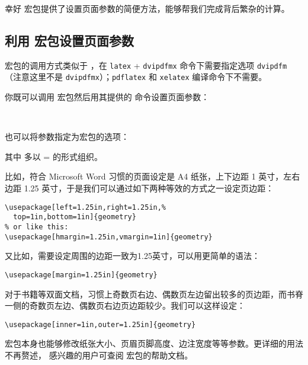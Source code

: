 幸好  宏包提供了设置页面参数的简便方法，能够帮我们完成背后繁杂的计算。

\subsection{利用  宏包设置页面参数}\label{subsec:geometry}

 宏包的调用方式类似于 ，在 \texttt{latex} + \texttt{dvipdfmx} 命令下需要指定选项 \texttt{dvipdfm}
（注意这里不是 \texttt{dvipdfmx}）；\texttt{pdflatex} 和 \texttt{xelatex} 编译命令下不需要。

你既可以调用  宏包然后用其提供的  命令设置页面参数：
\begin{command}
 \\
\end{command}
也可以将参数指定为宏包的选项：
\begin{command}
\end{command}

其中  多以 = 的形式组织。

比如，符合 Microsoft Word 习惯的页面设定是 A4 纸张，上下边距 1 英寸，左右边距 1.25 英寸，于是我们可以通过如下两种等效的方式之一设定页边距：
\begin{verbatim}
\usepackage[left=1.25in,right=1.25in,%
  top=1in,bottom=1in]{geometry}
% or like this:
\usepackage[hmargin=1.25in,vmargin=1in]{geometry}
\end{verbatim}

又比如，需要设定周围的边距一致为1.25英寸，可以用更简单的语法：
\begin{verbatim}
\usepackage[margin=1.25in]{geometry}
\end{verbatim}

对于书籍等双面文档，习惯上奇数页右边、偶数页左边留出较多的页边距，而书脊一侧的奇数页左边、偶数页右边页边距较少。我们可以这样设定：
\begin{verbatim}
\usepackage[inner=1in,outer=1.25in]{geometry}
\end{verbatim}

 宏包本身也能够修改纸张大小、页眉页脚高度、边注宽度等等参数。更详细的用法不再赘述，
感兴趣的用户可查阅  宏包的帮助文档。

